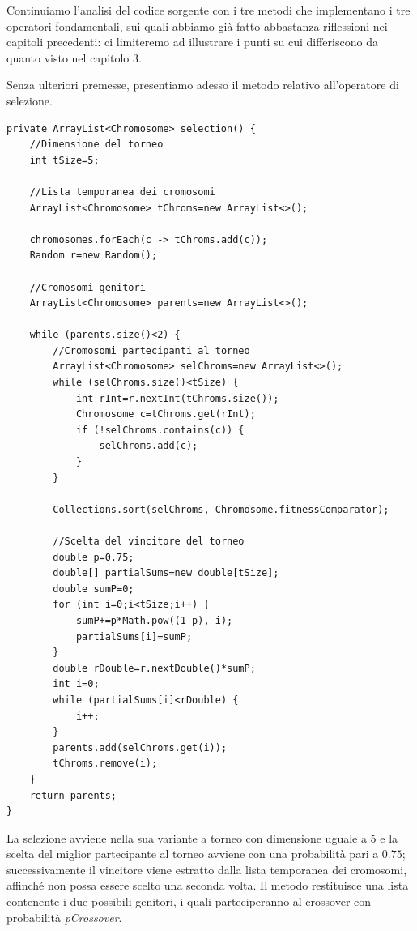 Continuiamo l'analisi del codice sorgente con i tre metodi che implementano i tre operatori fondamentali, sui quali abbiamo gi\`a fatto abbastanza riflessioni nei capitoli precedenti: ci limiteremo ad illustrare i punti su cui differiscono da quanto visto nel capitolo 3.

Senza ulteriori premesse, presentiamo adesso il metodo relativo all'operatore di selezione.
\begin{lstlisting}[style=Java]
private ArrayList<Chromosome> selection() {
	//Dimensione del torneo
	int tSize=5;
	
	//Lista temporanea dei cromosomi
	ArrayList<Chromosome> tChroms=new ArrayList<>();
	
	chromosomes.forEach(c -> tChroms.add(c));
	Random r=new Random();
	
	//Cromosomi genitori
	ArrayList<Chromosome> parents=new ArrayList<>();
	
	while (parents.size()<2) {
		//Cromosomi partecipanti al torneo
		ArrayList<Chromosome> selChroms=new ArrayList<>();
		while (selChroms.size()<tSize) {
			int rInt=r.nextInt(tChroms.size());
			Chromosome c=tChroms.get(rInt);
			if (!selChroms.contains(c)) {
				selChroms.add(c);
			}
		}
		
		Collections.sort(selChroms, Chromosome.fitnessComparator);
		
		//Scelta del vincitore del torneo
		double p=0.75;
		double[] partialSums=new double[tSize];
		double sumP=0;
		for (int i=0;i<tSize;i++) {
			sumP+=p*Math.pow((1-p), i);
			partialSums[i]=sumP;
		}
		double rDouble=r.nextDouble()*sumP;
		int i=0;
		while (partialSums[i]<rDouble) {
			i++;
		}
		parents.add(selChroms.get(i));
		tChroms.remove(i);
	}
	return parents;
}
\end{lstlisting}
La selezione avviene nella sua variante a torneo con dimensione uguale a 5 e la scelta del miglior partecipante al torneo avviene con una probabilit\`a pari a $0.75$; successivamente il vincitore viene estratto dalla lista temporanea dei cromosomi, affinch\'e non possa essere scelto una seconda volta. Il metodo restituisce una lista contenente i due possibili genitori, i quali parteciperanno al crossover con probabilit\`a \textit{pCrossover}.
\vspace{3mm}

